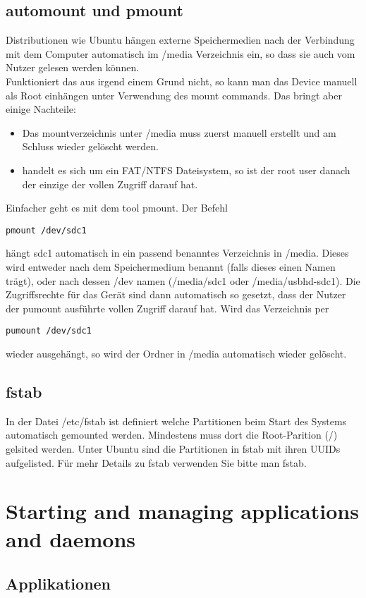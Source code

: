 \documentclass[10pt,paper=a4,final]{scrartcl}
\begin{document}
\subsection{automount und pmount}
Distributionen wie Ubuntu h\"angen externe Speichermedien nach der Verbindung mit dem Computer automatisch im /media Verzeichnis ein, so dass sie auch vom Nutzer gelesen werden k\"onnen.\\
Funktioniert das aus irgend einem Grund nicht, so kann man das Device manuell als Root einh\"angen unter Verwendung des mount commands. Das bringt aber einige Nachteile:
\begin{itemize}
\item Das mountverzeichnis unter /media muss zuerst manuell erstellt und am Schluss wieder gel\"oscht werden.
\item handelt es sich um ein FAT/NTFS Dateisystem, so ist der root user danach der einzige der vollen Zugriff darauf hat.
\end{itemize}
Einfacher geht es mit dem tool pmount. Der Befehl
\begin{lstlisting}[frame=single]
pmount /dev/sdc1
\end{lstlisting}
h\"angt sdc1 automatisch in ein passend benanntes Verzeichnis in /media. Dieses wird entweder nach dem Speichermedium benannt (falls dieses einen Namen tr\"agt), oder nach dessen /dev namen (/media/sdc1 oder /media/usbhd-sdc1). Die Zugriffsrechte f\"ur das Ger\"at sind dann automatisch so gesetzt, dass der Nutzer der pumount ausf\"uhrte vollen Zugriff darauf hat. Wird das Verzeichnis per
\begin{lstlisting}[frame=single]
pumount /dev/sdc1
\end{lstlisting}
wieder ausgeh\"angt, so wird der Ordner in /media automatisch wieder gel\"oscht.
\subsection{fstab}
In der Datei /etc/fstab ist definiert welche Partitionen beim Start des Systems automatisch gemounted werden. Mindestens muss dort die Root-Parition (/) gelsited werden. Unter Ubuntu sind die Partitionen in fstab mit ihren UUIDs aufgelisted. F\"ur mehr Details zu fstab verwenden Sie bitte man fstab.

\section{Starting and managing applications and daemons}
\subsection{Applikationen}
\end{document}
